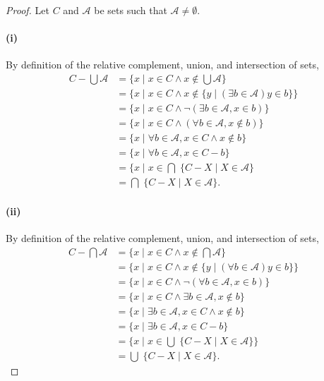 \documentclass{report}
\begin{document}
  \begin{proof}

    Let $C$ and $\mathscr{A}$ be sets such that $\mathscr{A} \neq \emptyset$.

    \paragraph{(i)}%

      By definition of the relative complement, union, and intersection of sets,
        \begin{align*}
          C - \bigcup \mathscr{A}
            & = \{ x \mid x \in C \land x \not\in \bigcup \mathscr{A} \} \\
            & = \{ x \mid x \in C \land
              x \not\in \{ y \mid (\exists b \in \mathscr{A}) y \in b \}\} \\
            & = \{ x \mid x \in C \land
              \neg(\exists b \in \mathscr{A}, x \in b) \} \\
            & = \{ x \mid x \in C \land
              (\forall b \in \mathscr{A}, x \not\in b) \} \\
            & = \{ x \mid
              \forall b \in \mathscr{A}, x \in C \land x \not\in b \} \\
            & = \{ x \mid \forall b \in \mathscr{A}, x \in C - b \} \\
            & = \{ x \mid x \in \bigcap\; \{ C - X \mid X \in \mathscr{A} \} \\
            & = \bigcap\; \{ C - X \mid X \in \mathscr{A} \}.
        \end{align*}

    \paragraph{(ii)}%

      By definition of the relative complement, union, and intersection of sets,
        \begin{align*}
          C - \bigcap \mathscr{A}
            & = \{ x \mid x \in C \land x \not\in \bigcap \mathscr{A} \} \\
            & = \{ x \mid x \in C \land
              x \not\in \{ y \mid (\forall b \in \mathscr{A}) y \in b \}\} \\
            & = \{ x \mid x \in C \land
              \neg(\forall b \in \mathscr{A}, x \in b) \} \\
            & = \{ x \mid x \in C \land
              \exists b \in \mathscr{A}, x \not\in b \} \\
            & = \{ x \mid
              \exists b \in \mathscr{A}, x \in C \land x \not\in b \} \\
            & = \{ x \mid \exists b \in \mathscr{A}, x \in C - b \} \\
            & = \{ x \mid x \in \bigcup\; \{ C - X \mid X \in \mathscr{A} \} \} \\
            & = \bigcup\; \{ C - X \mid X \in \mathscr{A} \}.
        \end{align*}

  \end{proof}
\end{document}
